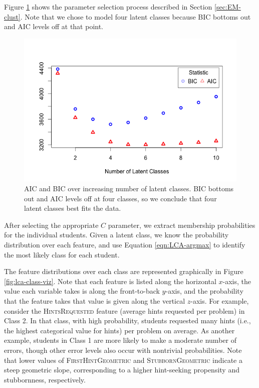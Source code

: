 \documentclass{edm_template}
\newcommand{\ftr}[1]{\textsc{#1}}
\begin{document}
Figure \ref{fig:lca-test-statistics} shows the parameter selection process described in Section \ref{sec:EM-clust}. Note that we chose to model four latent classes because BIC bottoms out and AIC levels off at that point.

\begin{figure}[htbp]
\includegraphics[scale=0.4]{lca-stats-plot.png}
\caption{AIC and BIC over increasing number of latent classes. BIC bottoms out and AIC levels off at four classes, so we conclude that four latent classes best fits the data.}
\label{fig:lca-test-statistics}
\end{figure}

After selecting the appropriate $C$ parameter, we extract membership probabilities for the individual students. Given a latent class, we know the probability distribution over each feature, and use Equation \ref{eqn:LCA-argmax} to identify the most likely class for each student.

The feature distributions over each class are represented graphically in Figure \ref{fig:lca-class-viz}. Note that each feature is listed along the horizontal $x$-axis, the value each variable takes is along the front-to-back $y$-axis, and the probability that the feature takes that value is given along the vertical $z$-axis. For example, consider the \ftr{HintsRequested} feature (average hints requested per problem) in Class 2. In that class, with high probability, students requested many hints (i.e., the highest categorical value for hints) per problem on average. As another example, students in Class 1 are more likely to make a moderate number of errors, though other error levels also occur with nontrivial probabilities. Note that lower values of \ftr{FirstHintGeometric} and \ftr{StubbornGeometric} indicate a steep geometric slope, corresponding to a higher hint-seeking propensity and stubbornness, respectively.
\end{document}

